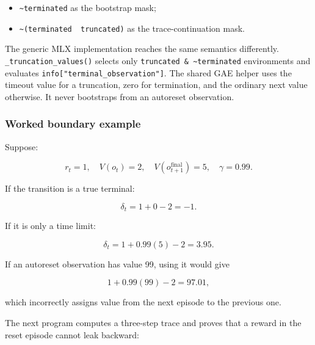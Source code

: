 \documentclass[
  american,
  11pt,
  letterpaper,
]{article}
\providecommand{\tightlist}{%
  \setlength{\itemsep}{0pt}\setlength{\parskip}{0pt}}
\begin{document}
\begin{itemize}
\tightlist
\item
  \texttt{\textasciitilde{}terminated} as the bootstrap mask;
\item
  \texttt{\textasciitilde{}(terminated\ \textbar{}\ truncated)} as the
  trace-continuation mask.
\end{itemize}

The generic MLX implementation reaches the same semantics differently.
\texttt{\_truncation\_values()} selects only
\texttt{truncated\ \&\ \textasciitilde{}terminated} environments and
evaluates \texttt{info{[}"terminal\_observation"{]}}. The shared GAE
helper uses the timeout value for a truncation, zero for termination,
and the ordinary next value otherwise. It never bootstraps from an
autoreset observation.

\subsubsection{Worked boundary example}\label{worked-boundary-example}

Suppose:

\[
r_t=1,\quad V(o_t)=2,\quad
V(o_{t+1}^{\mathrm{final}})=5,\quad \gamma=0.99.
\]

If the transition is a true terminal:

\[
\delta_t=1+0-2=-1.
\]

If it is only a time limit:

\[
\delta_t=1+0.99(5)-2=3.95.
\]

If an autoreset observation has value 99, using it would give

\[
1+0.99(99)-2=97.01,
\]

which incorrectly assigns value from the next episode to the previous
one.

The next program computes a three-step trace and proves that a reward in
the reset episode cannot leak backward:
\end{document}
